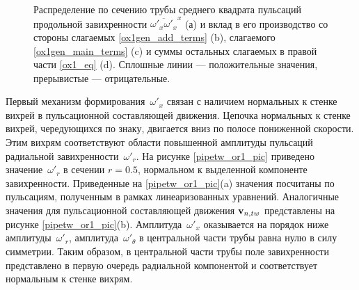 \begin{figure}
\caption{Распределение по сечению трубы среднего квадрата пульсаций продольной завихренности $\overline{\omega'_x \omega'_x }^x$ (а) и вклад в его производство со стороны слагаемых \eqref{ox1gen_add_terms} (b), слагаемого \eqref{ox1gen_main_terms} (c) и суммы остальных слагаемых в правой части \eqref{ox1_eq} (d). Сплошные линии --- положительные значения, прерывистые --- отрицательные.}
\label{ox1gen_pic}
\end{figure}


Первый механизм формирования~$\omega'_x$ связан с наличием нормальных к стенке вихрей в пульсационной составляющей движения. Цепочка нормальных к стенке вихрей, чередующихся по знаку, двигается вниз по полосе пониженной скорости. Этим вихрям соответствуют области повышенной амплитуды пульсаций радиальной завихренности~$\omega'_r$. На рисунке \ref{pipetw_or1_pic} приведено значение~$\omega'_r$ в сечении $r = 0.5$, нормальном к выделенной компоненте завихренности. Приведенные на \ref{pipetw_or1_pic}(a) значения посчитаны по пульсациям, полученным в рамках линеаризованных уравнений. Аналогичные значения для пульсационной составляющей движения $\mathbf{v}_{n,tw}$ представлены на рисунке \ref{pipetw_or1_pic}(b). Амплитуда~$\omega'_x$ оказывается на порядок ниже амплитуды~$\omega'_r$, амплитуда~$\omega'_\theta$ в центральной части трубы равна нулю в силу симметрии. Таким образом, в центральной части трубы поле завихренности представлено в первую очередь радиальной компонентой и соответствует нормальным к стенке вихрям.

